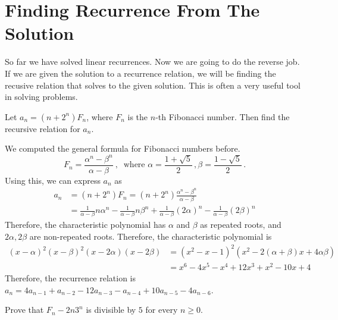 \documentclass[11pt]{scrartcl}
\begin{document}
\section{Finding Recurrence From The Solution}
So far we have solved linear recurrences. Now we are going to do the reverse job. If we are given the solution to a recurrence relation, we will be finding the recusive relation that solves to the given solution. This is often a very useful tool in solving problems.
\begin{exercise}
Let \(a_n = \left(n+2^n \right) F_n \), where \(F_n\) is the \(n\)-th Fibonacci number. Then find the recursive relation for \(a_n\).
\end{exercise}
\begin{soln}
We computed the general formula for Fibonacci numbers before.
\[ F_n = \frac{\alpha^n - \beta^n}{\alpha - \beta} \ , \ \text{ where } \alpha = \frac{1+\sqrt 5}{2} \, , \beta = \frac{1-\sqrt 5}{2}\, . \]
Using this, we can express \(a_n\) as
\begin{equation*}
\begin{split}
a_n &= \left(n+2^n \right) F_n = \left(n+2^n \right) \frac{\alpha^n - \beta^n}{\alpha - \beta} \\
&= \frac{1}{\alpha - \beta} n \alpha^n - \frac{1}{\alpha - \beta} n \beta^n + \frac{1}{\alpha - \beta} \left(2\alpha\right) ^n - \frac{1}{\alpha - \beta} \left(2\beta\right) ^n
\end{split}
\end{equation*}
Therefore, the characteristic polynomial has \(\alpha\) and \(\beta\) as repeated roots, and \(2\alpha, 2 \beta\) are non-repeated roots. Therefore, the characteristic polynomial is
\begin{equation*}
\begin{split}
\left(x-\alpha\right)^2 \left(x-\beta\right) ^2 \left(x-2 \alpha\right) \left(x- 2 \beta\right) &= \left(x^2 -x-1\right) ^2 \left(x^2 - 2 \left(\alpha+ \beta\right)x + 4 \alpha\beta\right) \\
&=x^6 - 4x^5 - x^4 + 12x^3 + x^2 - 10x + 4
\end{split}
\end{equation*}
Therefore, the recurrence relation is \(a_n = 4a_{n-1} + a_{n-2} - 12 a_{n-3} - a_{n-4} + 10 a_{n-5} - 4a_{n-6}\).
\end{soln}
\begin{exercise}
Prove that \(F_n - 2n3^n\) is divisible by \(5\) for every \(n \ge 0\).
\end{exercise}
\end{document}
